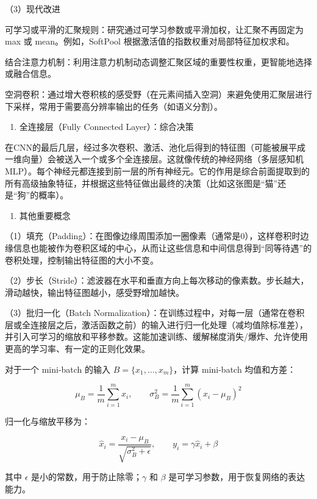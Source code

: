 （3）现代改进

可学习或平滑的汇聚规则：研究通过可学习参数或平滑加权，让汇聚不再固定为 max 或 mean。例如，SoftPool 根据激活值的指数权重对局部特征加权求和。

结合注意力机制：利用注意力机制动态调整汇聚区域的重要性权重，更智能地选择或融合信息。

空洞卷积：通过增大卷积核的感受野（在元素间插入空洞）来避免使用汇聚层进行下采样，常用于需要高分辨率输出的任务（如语义分割）。

\begin{enumerate}
\def\labelenumi{\arabic{enumi}.}
\setcounter{enumi}{3}
\tightlist
\item
  全连接层（Fully Connected Layer）：综合决策
\end{enumerate}

在CNN的最后几层，经过多次卷积、激活、池化后得到的特征图（可能被展平成一维向量）会被送入一个或多个全连接层。这就像传统的神经网络（多层感知机MLP）。每个神经元都连接到前一层的所有神经元。它的作用是综合前面提取到的所有高级抽象特征，并根据这些特征做出最终的决策（比如这张图是``猫''还是``狗''的概率）。

\begin{enumerate}
\def\labelenumi{\arabic{enumi}.}
\setcounter{enumi}{4}
\tightlist
\item
  其他重要概念
\end{enumerate}

（1）填充（Padding）：在图像边缘周围添加一圈像素（通常是0），这样卷积时边缘信息也能被作为卷积区域的中心，从而让这些信息和中间信息得到``同等待遇''的卷积处理，控制输出特征图的大小不变。

（2）步长（Stride）：滤波器在水平和垂直方向上每次移动的像素数。步长越大，滑动越快，输出特征图越小，感受野增加越快。

（3）批归一化（Batch Normalization）：在训练过程中，对每一层（通常在卷积层或全连接层之后，激活函数之前）的输入进行归一化处理（减均值除标准差），并引入可学习的缩放和平移参数。这能加速训练、缓解梯度消失/爆炸、允许使用更高的学习率、有一定的正则化效果。

对于一个 mini-batch 的输入 \(B=\{x_1,\ldots,x_m\}\)，计算 mini-batch 均值和方差：

\[
\mu_B=\frac{1}{m}\sum_{i=1}^{m}x_i,\qquad
\sigma_B^2=\frac{1}{m}\sum_{i=1}^{m}(x_i-\mu_B)^2
\]

归一化与缩放平移为：

\[
\hat{x}_i=\frac{x_i-\mu_B}{\sqrt{\sigma_B^2+\epsilon}},\qquad
y_i=\gamma\hat{x}_i+\beta
\]

其中 \(\epsilon\) 是小的常数，用于防止除零；\(\gamma\) 和 \(\beta\) 是可学习参数，用于恢复网络的表达能力。

